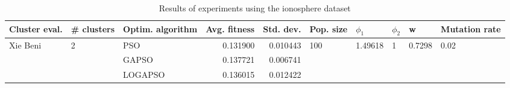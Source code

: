 \begin{table}
\centering
\caption{Results of experiments using the ionosphere dataset}
\begin{tabular}{lllrrlllll}
\toprule
            Cluster eval. &        \# clusters & Optim. algorithm &  Avg. fitness &  Std. dev. &            Pop. size &               $\phi_{1}$ &         $\phi_{2}$ &                       w &         Mutation rate \\
\midrule
\multirow{3}{*}{Xie Beni} & \multirow{3}{*}{2} &              PSO &      0.131900 &   0.010443 & \multirow{3}{*}{100} & \multirow{3}{*}{1.49618} & \multirow{3}{*}{1} & \multirow{3}{*}{0.7298} & \multirow{3}{*}{0.02} \\
                          &                    &            GAPSO &      0.137721 &   0.006741 &                      &                          &                    &                         &                       \\
                          &                    &          LOGAPSO &      0.136015 &   0.012422 &                      &                          &                    &                         &                       \\
\bottomrule
\end{tabular}
\end{table}
